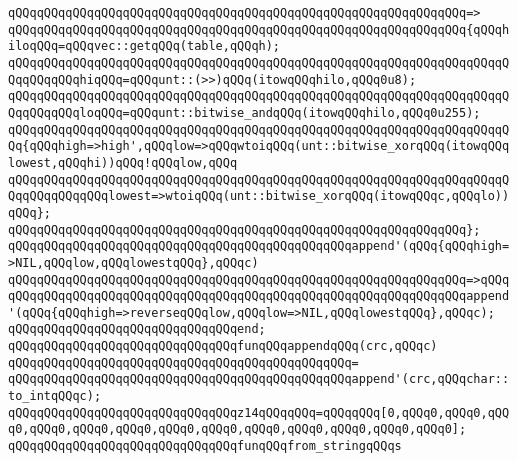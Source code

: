 \verb|qQQqqQQqqQQqqQQqqQQqqQQqqQQqqQQqqQQqqQQqqQQqqQQqqQQqqQQqqQQqqQQq=>|\newline
\verb|qQQqqQQqqQQqqQQqqQQqqQQqqQQqqQQqqQQqqQQqqQQqqQQqqQQqqQQqqQQqqQQq{qQQqhiloqQQq=qQQqvec::getqQQq(table,qQQqh);|\newline
\verb|qQQqqQQqqQQqqQQqqQQqqQQqqQQqqQQqqQQqqQQqqQQqqQQqqQQqqQQqqQQqqQQqqQQqqQQqqQQqqQQqhiqQQq=qQQqunt::(>>)qQQq(itowqQQqhilo,qQQq0u8);|\newline
\verb|qQQqqQQqqQQqqQQqqQQqqQQqqQQqqQQqqQQqqQQqqQQqqQQqqQQqqQQqqQQqqQQqqQQqqQQqqQQqqQQqloqQQq=qQQqunt::bitwise_andqQQq(itowqQQqhilo,qQQq0u255);|\newline
\verb|qQQqqQQqqQQqqQQqqQQqqQQqqQQqqQQqqQQqqQQqqQQqqQQqqQQqqQQqqQQqqQQqqQQqqQQq{qQQqhigh=>high',qQQqlow=>qQQqwtoiqQQq(unt::bitwise_xorqQQq(itowqQQqlowest,qQQqhi))qQQq!qQQqlow,qQQq|\newline
\verb|qQQqqQQqqQQqqQQqqQQqqQQqqQQqqQQqqQQqqQQqqQQqqQQqqQQqqQQqqQQqqQQqqQQqqQQqqQQqqQQqqQQqlowest=>wtoiqQQq(unt::bitwise_xorqQQq(itowqQQqc,qQQqlo))qQQq};|\newline
\verb|qQQqqQQqqQQqqQQqqQQqqQQqqQQqqQQqqQQqqQQqqQQqqQQqqQQqqQQqqQQqqQQq};|\newline
\newline
\verb|qQQqqQQqqQQqqQQqqQQqqQQqqQQqqQQqqQQqqQQqqQQqqQQqappend'(qQQq{qQQqhigh=>NIL,qQQqlow,qQQqlowestqQQq},qQQqc)|\newline
\verb|qQQqqQQqqQQqqQQqqQQqqQQqqQQqqQQqqQQqqQQqqQQqqQQqqQQqqQQqqQQqqQQq=>qQQq|\newline
\verb|qQQqqQQqqQQqqQQqqQQqqQQqqQQqqQQqqQQqqQQqqQQqqQQqqQQqqQQqqQQqqQQqappend'(qQQq{qQQqhigh=>reverseqQQqlow,qQQqlow=>NIL,qQQqlowestqQQq},qQQqc);|\newline
\verb|qQQqqQQqqQQqqQQqqQQqqQQqqQQqqQQqend;|\newline
\newline
\newline
\verb|qQQqqQQqqQQqqQQqqQQqqQQqqQQqqQQqfunqQQqappendqQQq(crc,qQQqc)|\newline
\verb|qQQqqQQqqQQqqQQqqQQqqQQqqQQqqQQqqQQqqQQqqQQqqQQq=|\newline
\verb|qQQqqQQqqQQqqQQqqQQqqQQqqQQqqQQqqQQqqQQqqQQqqQQqappend'(crc,qQQqchar::to_intqQQqc);|\newline
\newline
\verb|qQQqqQQqqQQqqQQqqQQqqQQqqQQqqQQqz14qQQqqQQq=qQQqqQQq[0,qQQq0,qQQq0,qQQq0,qQQq0,qQQq0,qQQq0,qQQq0,qQQq0,qQQq0,qQQq0,qQQq0,qQQq0,qQQq0];|\newline
\newline
\verb|qQQqqQQqqQQqqQQqqQQqqQQqqQQqqQQqfunqQQqfrom_stringqQQqs|\newline
